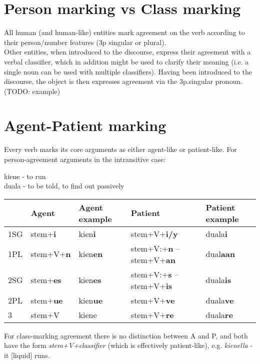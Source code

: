 \documentclass[8pt]{book}
\begin{document}
\section{Person marking vs Class marking}
All human (and human-like) entities mark agreement on the verb according to their person/number features (3p singular or plural). \\ 
Other entities, when introduced to the discourse, express their agreement with a verbal classifier, which in addition might be used to clarify their meaning (i.e. a single noun can be used with multiple classifiers). Having been introduced to the discourse, the object is then expresses agreement via the 3p.singular pronoun. (TODO: example)

\section{Agent-Patient marking}
Every verb marks its core arguments as either agent-like or patient-like. For person-agreement arguments in the intransitive case:

kiene - to run \\
duala - to be told, to find out passively

\begin{center}
\begin{tabular}{l|l|l|l|l}
\hline
  & Agent & Agent example & Patient & Patient example \\ \hline
1SG & stem+\textbf{i} & kien\textbf{i} & stem+V+\textbf{i/y} & duala\textbf{i} \\ \hline
1PL & stem+V+\textbf{n} & kien\textbf{en} &  stem+V:+\textbf{n} -- stem+V+\textbf{an} & dual\textbf{aan} \\ \hline
2SG & stem+\textbf{es}  & kien\textbf{es} & stem+V:+\textbf{s} -- stem+V+\textbf{is} & duala\textbf{is} \\ \hline
2PL & stem+\textbf{ue} & kien\textbf{ue} & stem+V+\textbf{ve} & duala\textbf{ve} \\ \hline
3 & stem+V & kiene & stem+V+\textbf{re} & duala\textbf{re} \\\hline

\end{tabular}
\end{center}

For class-marking agreement there is no distinction between A and P, and both have the form \textit{stem+V+classifier} (which is effectively patient-like), e.g. \textit{kienella} - it [liquid] runs. \\
\end{document}
